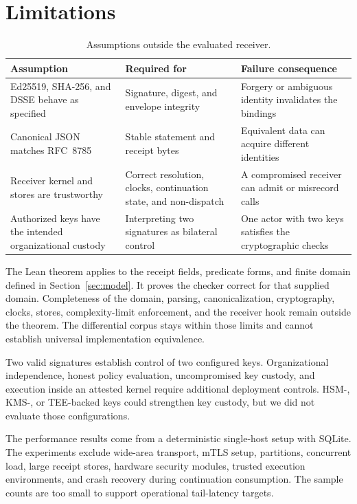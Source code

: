 \section{Limitations}
\label{sec:limits}

\begin{table}[t]
\caption{Assumptions outside the evaluated receiver.}
\label{tab:assumptions}
\scriptsize
\begin{tabularx}{\textwidth}{@{}>{\raggedright\arraybackslash}p{}>{\raggedright\arraybackslash}p{}>{\raggedright\arraybackslash}X@{}}
\toprule
Assumption & Required for & Failure consequence \\
\midrule
Ed25519, SHA-256, and DSSE behave as specified
& Signature, digest, and envelope integrity
& Forgery or ambiguous identity invalidates the bindings \\
Canonical JSON matches RFC~8785
& Stable statement and receipt bytes \cite{rfc8785}
& Equivalent data can acquire different identities \\
Receiver kernel and stores are trustworthy
& Correct resolution, clocks, continuation state, and non-dispatch
& A compromised receiver can admit or misrecord calls \\
Authorized keys have the intended organizational custody
& Interpreting two signatures as bilateral control
& One actor with two keys satisfies the cryptographic checks \\
\bottomrule
\end{tabularx}
\end{table}

The Lean theorem applies to the receipt fields, predicate forms, and finite
domain defined in Section~\ref{sec:model}. It proves the checker correct for
that supplied domain. Completeness of the domain, parsing, canonicalization,
cryptography, clocks, stores, complexity-limit enforcement, and the receiver
hook remain outside the theorem. The differential corpus stays within those
limits and cannot establish universal implementation equivalence.

Two valid signatures establish control of two configured keys. Organizational
independence, honest policy evaluation, uncompromised key custody, and execution
inside an attested kernel require additional deployment controls. HSM-, KMS-,
or TEE-backed keys could strengthen key custody, but we did not evaluate those
configurations.

The performance results come from a deterministic single-host setup with
SQLite. The experiments exclude wide-area transport, mTLS setup, partitions,
concurrent load, large receipt stores, hardware security modules, trusted
execution environments, and crash recovery during continuation consumption.
The sample counts are too small to support operational tail-latency targets.


